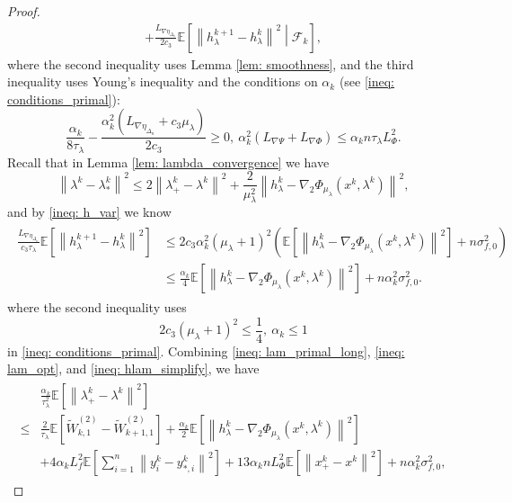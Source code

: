 \documentclass[10pt]{article}
\theoremstyle{remark}
\def\setF{\mathscr{F}} %
\newcommand{\E}{\mathbb{E}}
\newcommand{\norm}[1]{\left\|#1\right\|}
\begin{document}
\begin{proof}
\begin{align}
         + \frac{L_{\nabla\eta_{\Delta_n}}}{2c_3}\E\left[\norm{h_{\lambda}^{k+1} - h_{\lambda}^k}^2\middle|\setF_k\right],\label{ineq: lam_primal_long}
\end{align}
where the second inequality uses Lemma \ref{lem: smoothness}, and the third inequality uses Young's inequality and the conditions on $\alpha_k$ (see \eqref{ineq: conditions_primal}):
\[
    \frac{\alpha_k}{8\tau_{\lambda}} - \frac{\alpha_k^2(L_{\nabla\eta_{\Delta_n}} +c_3\mu_{\lambda})}{2c_3}\geq 0,\ \alpha_k^2(L_{\nabla\Psi} + L_{\nabla\Phi})\leq \alpha_kn\tau_{\lambda}L_{\Phi}^2.
\]
Recall that in Lemma \ref{lem: lambda_convergence} we have
\begin{equation}\label{ineq: lam_opt}
    \norm{\lambda^k-\lambda_*^k}^2\leq 2\norm{\lambda_+^k - \lambda^k}^2 + \frac{2}{\mu_{\lambda}^2}\norm{h_{\lambda}^k - \nabla_2\Phi_{\mu_{\lambda}}(x^k, \lambda^k)}^2,
\end{equation}
and by \eqref{ineq: h_var} we know
\begin{align}\label{ineq: hlam_simplify}
    \begin{aligned}
        \frac{L_{\nabla\eta_{\Delta_n}}}{c_3\tau_{\lambda}}\E\left[\norm{h_{\lambda}^{k+1} - h_{\lambda}^k}^2\right]&\leq 2c_3\alpha_k^2(\mu_{\lambda} + 1)^2\left(\E\left[\norm{h_{\lambda}^k - \nabla_2\Phi_{\mu_{\lambda}}(x^k,\lambda^k)}^2\right] + n\sigma_{f,0}^2\right) \\
        &\leq \frac{\alpha_k}{4}\E\left[\norm{h_{\lambda}^k - \nabla_2\Phi_{\mu_{\lambda}}(x^k,\lambda^k)}^2\right] + n\alpha_k^2\sigma_{f,0}^2.
    \end{aligned}
\end{align}
where the second inequality uses
\[
    2c_3(\mu_{\lambda} + 1)^2\leq \frac{1}{4},\ \alpha_k\leq 1
\]
in \eqref{ineq: conditions_primal}. Combining \eqref{ineq: lam_primal_long}, \eqref{ineq: lam_opt}, and \eqref{ineq: hlam_simplify}, we have
\begin{align}
    \begin{aligned}
        &\frac{\alpha_k}{\tau_{\lambda}^2}\E\left[\norm{\lambda_+^k - \lambda^k}^2\right] \\
        \leq &\frac{2}{\tau_{\lambda}}\E\left[\tilde W_{k,1}^{(2)} - \tilde W_{k+1,1}^{(2)}\right] + \frac{\alpha_k}{2}\E\left[\norm{h_{\lambda}^k - \nabla_2\Phi_{\mu_{\lambda}}(x^k,\lambda^k)}^2\right] \\
        & + 4\alpha_k L_f^2\E\left[\sum_{i=1}^{n}\norm{y_i^k-y_{*,i}^k}^2\right] + 13\alpha_kn L_{\Phi}^2\E\left[\norm{x_+^k - x^k}^2\right] + n\alpha_k^2\sigma_{f,0}^2,

\end{aligned}
\end{align}
\end{proof}
\end{document}
